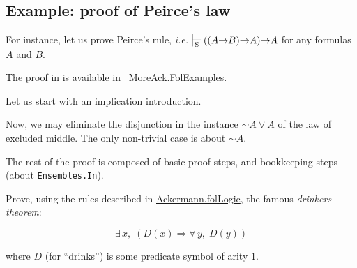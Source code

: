 

\subsection{Example: proof of Peirce's law}

For instance, let us prove Peirce's rule, \emph{i.e.}
$\sdash ((A \arrow B) \arrow A) \arrow A$ for any formulas $A$ and $B$.

 The proof in \coq is available in  ~\href{../theories/html/hydras.MoreAck.FolExamples.html}{MoreAck.FolExamples}.


Let us start with  an implication introduction.


Now, we may eliminate the disjunction 
in the instance $\sim A \vee A$ of the law of excluded middle.
The only non-trivial case is about $\sim A$.


The rest of the proof is composed of basic proof steps, 
and bookkeeping steps (about \texttt{Ensembles.In}).


\begin{exercise}
Prove, using the rules described in 
 \href{../theories/html/hydras.Ackermann.folLogic.html}{Ackermann.folLogic}, the famous \emph{drinkers theorem}:

$$\exists\,x,\; (D(x)\Longrightarrow \forall\,y,\; D(y))$$
\end{exercise}

where $D$ (for ``drinks'') is some predicate symbol of arity $1$.


